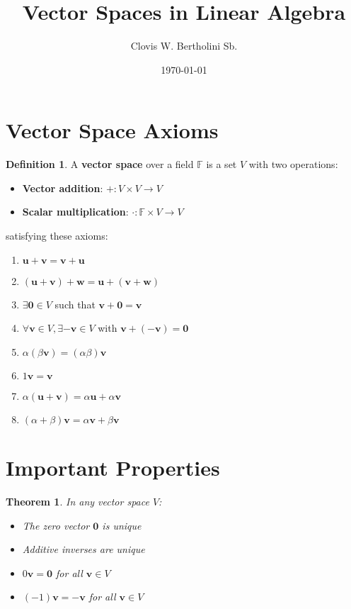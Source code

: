 \documentclass{article}
\title{Vector Spaces in Linear Algebra}
\author{Clovis W. Bertholini Sb.}
\date{\today}
\theoremstyle{plain}
\newtheorem{theorem}{Theorem}[section]
\theoremstyle{definition}
\newtheorem{definition}{Definition}[section]
\theoremstyle{remark}
\newcommand{\thmheader}[1]{%
  \textcolor{#1}{\normalfont\bfseries}%
}
\begin{document}
\maketitle

\section{Vector Space Axioms}
\begin{definition}
\thmheader{defcolor}A \textbf{vector space} over a field $\mathbb{F}$ is a set $V$ with two operations:
\begin{itemize}[leftmargin=*]
    \item \textbf{Vector addition}: $+: V \times V \to V$
    \item \textbf{Scalar multiplication}: $\cdot: \mathbb{F} \times V \to V$
\end{itemize}
satisfying these axioms:
\end{definition}

\begin{enumerate}[label=(V\arabic*),leftmargin=*]
    \item $\mathbf{u} + \mathbf{v} = \mathbf{v} + \mathbf{u}$
    \item $(\mathbf{u} + \mathbf{v}) + \mathbf{w} = \mathbf{u} + (\mathbf{v} + \mathbf{w})$
    \item $\exists \mathbf{0} \in V$ such that $\mathbf{v} + \mathbf{0} = \mathbf{v}$
    \item $\forall \mathbf{v} \in V, \exists -\mathbf{v} \in V$ with $\mathbf{v} + (-\mathbf{v}) = \mathbf{0}$
    \item $\alpha(\beta\mathbf{v}) = (\alpha\beta)\mathbf{v}$
    \item $1\mathbf{v} = \mathbf{v}$
    \item $\alpha(\mathbf{u} + \mathbf{v}) = \alpha\mathbf{u} + \alpha\mathbf{v}$
    \item $(\alpha + \beta)\mathbf{v} = \alpha\mathbf{v} + \beta\mathbf{v}$
\end{enumerate}

\section{Important Properties}
\begin{theorem}
\thmheader{theoremcolor}In any vector space $V$:
\begin{itemize}[leftmargin=*]
    \item The zero vector $\mathbf{0}$ is unique
    \item Additive inverses are unique
    \item $0\mathbf{v} = \mathbf{0}$ for all $\mathbf{v} \in V$
    \item $(-1)\mathbf{v} = -\mathbf{v}$ for all $\mathbf{v} \in V$
\end{itemize}
\end{theorem}
\end{document}
